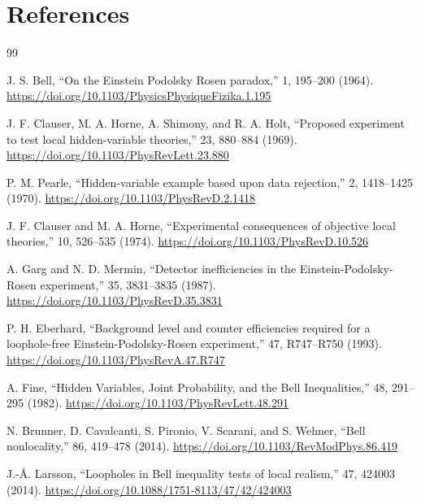 \documentclass[11pt]{article}
\begin{document}
\section{References}

\begin{thebibliography}{99}

J. S. Bell,
\newblock ``On the Einstein Podolsky Rosen paradox,''
 1, 195--200 (1964).
\newblock \url{https://doi.org/10.1103/PhysicsPhysiqueFizika.1.195}

J. F. Clauser, M. A. Horne, A. Shimony, and R. A. Holt,
\newblock ``Proposed experiment to test local hidden-variable theories,''
 23, 880--884 (1969).
\newblock \url{https://doi.org/10.1103/PhysRevLett.23.880}

P. M. Pearle,
\newblock ``Hidden-variable example based upon data rejection,''
 2, 1418--1425 (1970).
\newblock \url{https://doi.org/10.1103/PhysRevD.2.1418}

J. F. Clauser and M. A. Horne,
\newblock ``Experimental consequences of objective local theories,''
 10, 526--535 (1974).
\newblock \url{https://doi.org/10.1103/PhysRevD.10.526}

A. Garg and N. D. Mermin,
\newblock ``Detector inefficiencies in the Einstein-Podolsky-Rosen experiment,''
 35, 3831--3835 (1987).
\newblock \url{https://doi.org/10.1103/PhysRevD.35.3831}

P. H. Eberhard,
\newblock ``Background level and counter efficiencies required for a loophole-free Einstein-Podolsky-Rosen experiment,''
 47, R747--R750 (1993).
\newblock \url{https://doi.org/10.1103/PhysRevA.47.R747}

A. Fine,
\newblock ``Hidden Variables, Joint Probability, and the Bell Inequalities,''
 48, 291--295 (1982).
\newblock \url{https://doi.org/10.1103/PhysRevLett.48.291}

N. Brunner, D. Cavalcanti, S. Pironio, V. Scarani, and S. Wehner,
\newblock ``Bell nonlocality,''
 86, 419--478 (2014).
\newblock \url{https://doi.org/10.1103/RevModPhys.86.419}

J.-\AA{}. Larsson,
\newblock ``Loopholes in Bell inequality tests of local realism,''
 47, 424003 (2014).
\newblock \url{https://doi.org/10.1088/1751-8113/47/42/424003}


\end{thebibliography}
\end{document}
